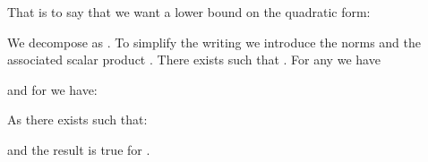 \documentclass[a4paper,12pt,onecolumn]{article}
\begin{document}
That is to say that we want a lower bound on the quadratic form: 

We decompose  as . To simplify the writing we introduce the norms  and the associated scalar product . There exists  such that . For any  we have 

 and for  we have:

As  there exists  such that:

and the result is true for .











\end{document}
